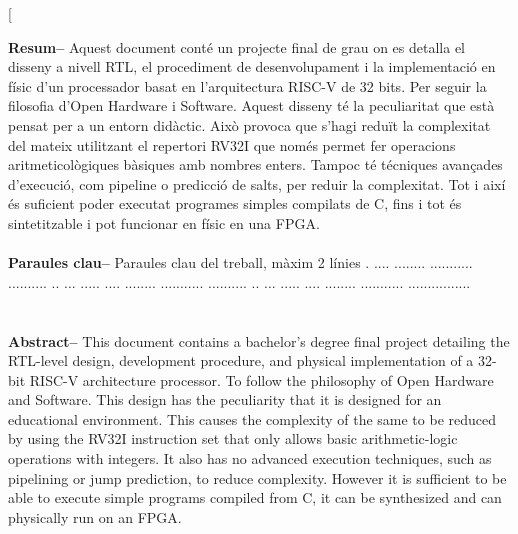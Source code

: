 \documentclass[10pt,a4paper,twocolumn,twoside]{article}
\begin{document}
\twocolumn[\begin{@twocolumnfalse}


\maketitle

\thispagestyle{primerapagina}
\begin{center}
\parbox{0.915\textwidth}
{\sffamily
\textbf{Resum--}
Aquest document conté un projecte final de grau on es detalla el disseny a nivell RTL, el procediment de desenvolupament i la implementació en físic d'un processador basat en l'arquitectura RISC-V de 32 bits. Per seguir la filosofia d'Open Hardware i Software. Aquest disseny té la peculiaritat que està pensat per a un entorn didàctic. Això provoca que s'hagi reduït la complexitat del mateix utilitzant el repertori RV32I que només permet fer operacions aritmeticològiques bàsiques amb nombres enters. Tampoc té técniques avançades d'execució, com pipeline o predicció de salts, per reduir la complexitat. Tot i així és suficient poder executat programes simples compilats de C, fins i tot és sintetitzable i pot funcionar en físic en una FPGA.
\\
\\
\textbf{Paraules clau-- } Paraules clau del treball, màxim 2 línies . .... ........ ........... .......... ..  ... ..... .... ........ ........... .......... ..  ... ..... .... ........ ........... ................\\
\\
\bigskip
\\
\textbf{Abstract--} This document contains a bachelor's degree final project detailing the RTL-level design, development procedure, and physical implementation of a 32-bit RISC-V architecture processor. To follow the philosophy of Open Hardware and Software. This design has the peculiarity that it is designed for an educational environment. This causes the complexity of the same to be reduced by using the RV32I instruction set that only allows basic arithmetic-logic operations with integers. It also has no advanced execution techniques, such as pipelining or jump prediction, to reduce complexity. However it is sufficient to be able to execute simple programs compiled from C, it can be synthesized and can physically run on an FPGA. 
}
\end{center}
\end{@twocolumnfalse}
\end{document}
